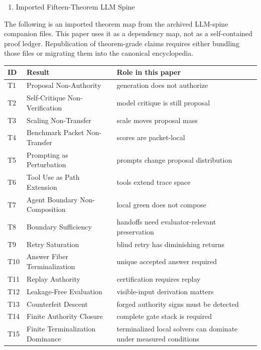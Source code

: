 \documentclass[
  10pt,
]{article}
\providecommand{\tightlist}{%
  \setlength{\itemsep}{0pt}\setlength{\parskip}{0pt}}
\providecommand{\tightlist}{%
  \setlength{\itemsep}{0pt}\setlength{\parskip}{0pt}}
\begin{document}
\begin{enumerate}
\def\labelenumi{\arabic{enumi}.}
\setcounter{enumi}{4}
\tightlist
\item
  Imported Fifteen-Theorem LLM Spine
\end{enumerate}

The following is an imported theorem map from the archived LLM-spine companion files. This paper uses it as a dependency map, not as a self-contained proof ledger. Republication of theorem-grade claims requires either bundling those files or migrating them into the canonical encyclopedia.

\begin{longtable}[]{@{}
  >{\raggedright\arraybackslash}p{}
  >{\raggedright\arraybackslash}p{}
  >{\raggedright\arraybackslash}p{}@{}}
\toprule\noalign{}
\begin{minipage}[b]{\linewidth}\raggedright
ID
\end{minipage} & \begin{minipage}[b]{\linewidth}\raggedright
Result
\end{minipage} & \begin{minipage}[b]{\linewidth}\raggedright
Role in this paper
\end{minipage} \\
\midrule\noalign{}
\endhead
\bottomrule\noalign{}
\endlastfoot
T1 & Proposal Non-Authority & generation does not authorize \\
T2 & Self-Critique Non-Verification & model critique is still proposal \\
T3 & Scaling Non-Transfer & scale moves proposal mass \\
T4 & Benchmark Packet Non-Transfer & scores are packet-local \\
T5 & Prompting as Perturbation & prompts change proposal distribution \\
T6 & Tool Use as Path Extension & tools extend trace space \\
T7 & Agent Boundary Non-Composition & local green does not compose \\
T8 & Boundary Sufficiency & handoffs need evaluator-relevant preservation \\
T9 & Retry Saturation & blind retry has diminishing returns \\
T10 & Answer Fiber Terminalization & unique accepted answer required \\
T11 & Replay Authority & certification requires replay \\
T12 & Leakage-Free Evaluation & visible-input derivation matters \\
T13 & Counterfeit Descent & forged authority signs must be detected \\
T14 & Finite Authority Closure & complete gate stack is required \\
T15 & Finite Terminalization Dominance & terminalized local solvers can dominate under measured conditions \\
\end{longtable}
\end{document}
